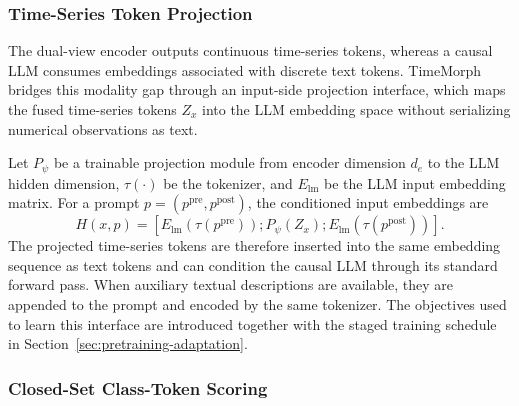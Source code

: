 \documentclass[10pt,journal,compsoc]{IEEEtran}
\begin{document}
\subsubsection{Time-Series Token Projection}
\label{sec:token-projection}
The dual-view encoder outputs continuous time-series tokens, whereas a causal LLM consumes embeddings associated with discrete text tokens.
TimeMorph bridges this modality gap through an input-side projection interface, which maps the fused time-series tokens $Z_x$ into the LLM embedding space without serializing numerical observations as text.

Let $P_\psi$ be a trainable projection module from encoder dimension $d_e$ to the LLM hidden dimension, $\tau(\cdot)$ be the tokenizer, and $E_{\mathrm{lm}}$ be the LLM input embedding matrix.
For a prompt $p=(p^{\mathrm{pre}},p^{\mathrm{post}})$, the conditioned input embeddings are
\begin{equation}
\label{eq:conditioned-input}
H(x,p)=
\left[
E_{\mathrm{lm}}(\tau(p^{\mathrm{pre}}));
P_{\psi}(Z_x);
E_{\mathrm{lm}}(\tau(p^{\mathrm{post}}))
\right].
\end{equation}
The projected time-series tokens are therefore inserted into the same embedding sequence as text tokens and can condition the causal LLM through its standard forward pass.
When auxiliary textual descriptions are available, they are appended to the prompt and encoded by the same tokenizer.
The objectives used to learn this interface are introduced together with the staged training schedule in Section~\ref{sec:pretraining-adaptation}.

\subsubsection{Closed-Set Class-Token Scoring}
\label{sec:class-token-classification}
\end{document}
